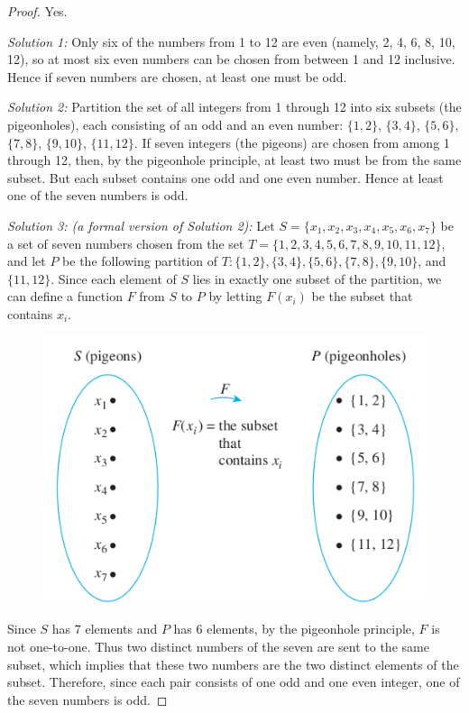 \documentclass[14pt]{extarticle}
\begin{document}
\begin{proof}
     Yes.

     {\it Solution 1:} Only six of the numbers from 1 to 12 are even (namely, 2, 4, 6, 8, 10, 12), so at most six even
     numbers can be chosen from between 1 and 12 inclusive. Hence if seven numbers are chosen, at least one must be odd.

          {\it Solution 2:} Partition the set of all integers from 1 through 12 into six subsets (the pigeonholes), each
     consisting of an odd and an even number: \(\{1, 2\}\), \(\{3, 4\}\), \(\{5, 6\}\), \(\{7, 8\}\), \(\{9, 10\}\),
     \(\{11, 12\}\). If seven integers (the pigeons) are chosen from among 1 through 12, then, by the pigeonhole principle,
     at least two must be from the same subset. But each subset contains one odd and one even number. Hence at least one of
     the seven numbers is odd.

          {\it Solution 3: (a formal version of Solution 2):} Let
     \(S = \{x_1, x_2, x_3, x_4, x_5, x_6, x_7\}\) be a set of
     seven numbers chosen from the set \(T = \{1, 2, 3, 4, 5, 6, 7, 8, 9, 10, 11, 12\}\), and let \(P\) be the following
     partition of \(T: \{1, 2\}, \{3, 4\}, \{5, 6\}, \{7, 8\}, \{9, 10\}\), and \(\{11, 12\}\). Since each element of
     \(S\) lies in exactly one subset of the partition, we can define a function \(F\) from \(S\) to \(P\) by letting
     \(F(x_i)\) be the subset that contains \(x_i\).

     \begin{figure}[ht!]
          \centering
          \includegraphics[scale=0.5]{../images/9.4.9.a.png}
     \end{figure}

     Since \(S\) has 7 elements and \(P\) has 6 elements, by the pigeonhole principle, \(F\) is not one-to-one. Thus two
     distinct numbers of the seven are sent to the same subset, which implies that these two numbers are the two distinct
     elements of the subset. Therefore, since each pair consists of one odd and one even integer, one of the seven numbers
     is odd.
\end{proof}
\end{document}
